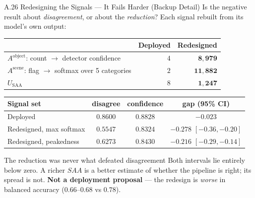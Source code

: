 \documentclass[aspectratio=169,11pt]{beamer}
\begin{document}
\begin{frame}{A.26 Redesigning the Signals --- It Fails Harder (Backup Detail)}
\scriptsize
Is the negative result about \emph{disagreement}, or about the \emph{reduction}? Each signal rebuilt from its model's own output:
\vspace{0.5mm}
\begin{center}\scriptsize
\begin{tabular}{@{}l r r@{}}
\toprule
& \textbf{Deployed} & \textbf{Redesigned} \\
\midrule
$A^{\text{object}}$: count $\rightarrow$ detector confidence & $4$ & $\mathbf{8{,}979}$ \\
$A^{\text{scene}}$: flag $\rightarrow$ softmax over 5 categories & $2$ & $\mathbf{11{,}882}$ \\
$U_{\text{SAA}}$ & $8$ & $\mathbf{1{,}247}$ \\
\bottomrule
\end{tabular}
\end{center}
\vspace{-1mm}
\begin{center}\scriptsize
\begin{tabular}{@{}l c c c@{}}
\toprule
\textbf{Signal set} & \textbf{disagree} & \textbf{confidence} & \textbf{gap (95\% CI)} \\
\midrule
Deployed & $0.8600$ & $0.8828$ & $-0.023$ \\
Redesigned, max softmax & $0.5547$ & $\mathbf{0.8324}$ & $\mathbf{-0.278}$ $[-0.36,-0.20]$ \\
Redesigned, peakedness & $0.6273$ & $\mathbf{0.8430}$ & $\mathbf{-0.216}$ $[-0.29,-0.14]$ \\
\bottomrule
\end{tabular}
\end{center}
\vspace{-2mm}
\begin{alertblock}{\scriptsize The reduction was never what defeated disagreement}
\scriptsize Both intervals lie entirely below zero. A richer $SAA$ is a better estimate of whether the pipeline is right; its spread is not. \textbf{Not a deployment proposal} --- the redesign is \emph{worse} in balanced accuracy ($0.66$--$0.68$ vs $0.78$).
\end{alertblock}
\end{frame}
\end{document}
